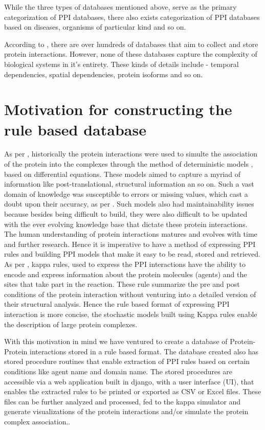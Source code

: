 \documentclass[msc,deptreport,ai]{infthesis}      %
\begin{document}
While the three types of databases mentioned above, serve as the primary categorization of PPI databases, there also exists categorization of PPI databases based on diseases, organisms of particular kind and so on.

According to \cite{typesOfPPIdb}, there are over hundreds of databases that aim to collect and store protein interactions. However, none of these databases capture the complexity of biological systems in it's entirety. These kinds of details include - temporal dependencies, spatial dependencies, protein isoforms and so on.

\section{Motivation for constructing the rule based database}
As per \cite{kappaPlatform}, historically the protein interactions were used to simulte the association of the protein into the complexes through the method of deterministic models , based on differential equations. These models aimed to capture a myriad of information like post-translational, structural information an so on. Such a vast domain of knowledge was susceptible to errors or missing values, which cast a doubt upon their accuracy, as per \cite{kappaPlatform}. Such models also had maintainability issues because besides being difficult to build, they were also difficult to be updated with the ever evolving knowledge base that dictate these protein interactions. The human understanding of protein interactions matures and evolves with time and further research. Hence it is imperative to have a method of expressing PPI rules and building PPI models that make it easy to be read, stored and retrieved. As per \cite{kappaPlatform}, kappa rules, used to express the PPI interactions have the ability to encode and express information about the protein molecules (agents) and the sites that take part in the reaction. These rule summarize the pre and post conditions of the protein interaction without venturing into a detailed version of their structural analysis. Hence the rule based format of expressing PPI interaction is more concise, the stochastic models built using Kappa rules enable the description of large protein complexes.

With this motivation in mind we have ventured to create a database of Protein-Protein interactions stored in a rule based format. The database created also has stored procedure routines that enable extraction of PPI rules based on certain conditions like agent name and domain name. The stored procedures are accessible via a web application built in django, with a user interface (UI), that enables the extracted rules to be printed or exported as CSV or Excel files. These files can be further analyzed and processed, fed to the kappa simulator \cite{kasim} and generate visualizations of the protein interactions and/or simulate the protein complex association..
\end{document}
